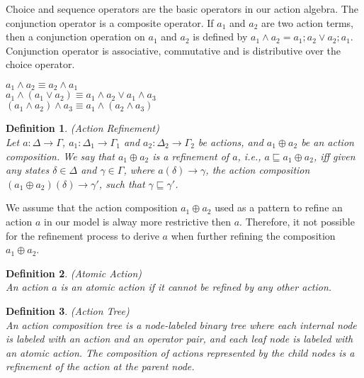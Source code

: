 \documentclass[12pt,journal,letterpaper,onecolumn]{IEEEtran}
\newtheorem{definition}{Definition}[section]
\begin{document}
Choice and sequence operators are the basic operators in our action
algebra. The conjunction operator is a composite operator. If $a_1$
and $a_2$ are two action terms, then a conjunction operation on
$a_1$ and $a_2$ is defined by $a_1 \wedge a_2 = a_1;a_2 \vee
a_2;a_1$. Conjunction operator is associative, commutative
 and is distributive over the choice operator.
\begin{center}
\begin{minipage}{4.5in}
\begin{multicols}{2}
$a_1 \wedge a_2 \equiv a_2 \wedge a_1$ \\
$a_1 \wedge (a_1 \vee a_2) \equiv a_1 \wedge a_2 \vee a_1 \wedge
a_3$\\
$(a_1 \wedge a_2) \wedge a_3 \equiv a_1 \wedge (a_2 \wedge a_3)$
\end{multicols}
\end{minipage}
\end{center}






\begin{definition}(Action Refinement)\\
Let $a:\Delta \rightarrow \Gamma$, $a_1:\Delta_1 \rightarrow
\Gamma_1$ and $a_2:\Delta_2 \rightarrow \Gamma_2$ be actions, and
 $a_1 \oplus a_2$ be an action composition. We say that $a_1
\oplus a_2$ is a refinement of $a$, i.e., $a \sqsubseteq a_1 \oplus
a_2$, iff given any states $\delta \in \Delta$ and $\gamma \in
\Gamma$, where $a(\delta) \rightarrow \gamma$, the action
composition $(a_1\oplus a_2)(\delta) \rightarrow \gamma'$, such that
$\gamma \sqsubseteq \gamma'$. \label{def:action-refinement}
\end{definition}

We assume that the action composition $a_1\oplus a_2$ used
as a pattern to refine an action $a$ in our model is alway more 
restrictive then $a$. Therefore, it not possible for the refinement
process to derive $a$ when further refining the composition 
$a_1\oplus a_2$.


\begin{definition}(Atomic Action)\\
 An action $a$ is an atomic action if it
cannot be refined by any other action.
\end{definition}

\begin{definition}(Action Tree)\\
An action composition tree is a node-labeled binary tree where each
internal node is labeled with an action and an operator pair, and
each leaf node is labeled with an atomic action. The composition of
actions represented by the child nodes is a refinement of the action
at the parent node.
\end{definition}
\end{document}
